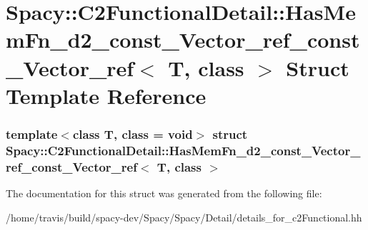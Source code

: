 \hypertarget{structSpacy_1_1C2FunctionalDetail_1_1HasMemFn__d2__const__Vector__ref__const__Vector__ref}{\section{\-Spacy\-:\-:\-C2\-Functional\-Detail\-:\-:\-Has\-Mem\-Fn\-\_\-d2\-\_\-const\-\_\-\-Vector\-\_\-ref\-\_\-const\-\_\-\-Vector\-\_\-ref$<$ \-T, class $>$ \-Struct \-Template \-Reference}
\label{structSpacy_1_1C2FunctionalDetail_1_1HasMemFn__d2__const__Vector__ref__const__Vector__ref}
}
\subsubsection*{template$<$class T, class = void$>$ struct Spacy\-::\-C2\-Functional\-Detail\-::\-Has\-Mem\-Fn\-\_\-d2\-\_\-const\-\_\-\-Vector\-\_\-ref\-\_\-const\-\_\-\-Vector\-\_\-ref$<$ T, class $>$}



\-The documentation for this struct was generated from the following file\-:\begin{DoxyCompactItemize}
\item 
/home/travis/build/spacy-\/dev/\-Spacy/\-Spacy/\-Detail/details\-\_\-for\-\_\-c2\-Functional.\-hh\end{DoxyCompactItemize}
